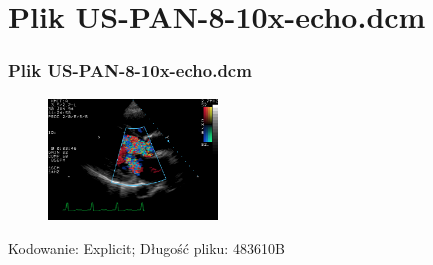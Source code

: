 \section{Plik US-PAN-8-10x-echo.dcm}
\begin{frame}
  \frametitle{Plik US-PAN-8-10x-echo.dcm}

  \begin{figure}
    \includegraphics[width=0.4\textwidth]{echo}
  \end{figure}
  Kodowanie: Explicit; Długość pliku: 483610B
\end{frame}

